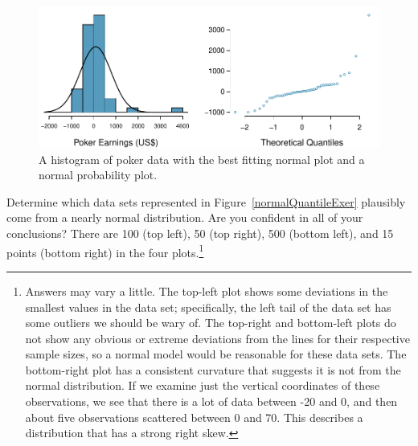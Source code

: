 \begin{figure}
\centering
\includegraphics[width=\textwidth]{02/figures/pokerNormal/pokerNormal}
\caption{A histogram of poker data with the best fitting normal plot and a normal probability plot.}
\label{pokerNormal}
\end{figure}

\textA{\pagebreak}

\begin{exercise}\label{normalQuantileExercise}
Determine which data sets represented in Figure~\ref{normalQuantileExer} plausibly come from a nearly normal distribution. Are you confident in all of your conclusions? There are 100 (top left), 50 (top right), 500 (bottom left), and 15 points (bottom right) in the four plots.\footnote{Answers may vary a little. The top-left plot shows some deviations in the smallest values in the data set; specifically, the left tail of the data set has some outliers we should be wary of. The top-right and bottom-left plots do not show any obvious or extreme deviations from the lines for their respective sample sizes, so a normal model would be reasonable for these data sets. The bottom-right plot has a consistent curvature that suggests it is not from the normal distribution. If we examine just the vertical coordinates of these observations, we see that there is a lot of data between -20 and 0, and then about five observations scattered between 0 and 70. This describes a distribution that has a strong right skew.}
\end{exercise}

